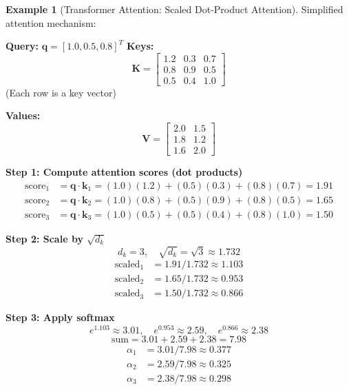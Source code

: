 \documentclass[12pt,a4paper]{article}
\theoremstyle{definition}
\newtheorem{example}{Example}[section]
\begin{document}
\begin{example}[Transformer Attention: Scaled Dot-Product Attention]
Simplified attention mechanism:

\textbf{Query:} $\mathbf{q} = [1.0, 0.5, 0.8]^T$
\textbf{Keys:} 
\begin{equation}
\mathbf{K} = \begin{bmatrix}
1.2 & 0.3 & 0.7 \\
0.8 & 0.9 & 0.5 \\
0.5 & 0.4 & 1.0
\end{bmatrix}
\end{equation}
(Each row is a key vector)

\textbf{Values:}
\begin{equation}
\mathbf{V} = \begin{bmatrix}
2.0 & 1.5 \\
1.8 & 1.2 \\
1.6 & 2.0
\end{bmatrix}
\end{equation}

\textbf{Step 1: Compute attention scores (dot products)}
\begin{align}
\text{score}_1 &= \mathbf{q} \cdot \mathbf{k}_1 = (1.0)(1.2) + (0.5)(0.3) + (0.8)(0.7) = 1.91 \\
\text{score}_2 &= \mathbf{q} \cdot \mathbf{k}_2 = (1.0)(0.8) + (0.5)(0.9) + (0.8)(0.5) = 1.65 \\
\text{score}_3 &= \mathbf{q} \cdot \mathbf{k}_3 = (1.0)(0.5) + (0.5)(0.4) + (0.8)(1.0) = 1.50
\end{align}

\textbf{Step 2: Scale by $\sqrt{d_k}$}
\begin{equation}
d_k = 3, \quad \sqrt{d_k} = \sqrt{3} \approx 1.732
\end{equation}
\begin{align}
\text{scaled}_1 &= 1.91 / 1.732 \approx 1.103 \\
\text{scaled}_2 &= 1.65 / 1.732 \approx 0.953 \\
\text{scaled}_3 &= 1.50 / 1.732 \approx 0.866
\end{align}

\textbf{Step 3: Apply softmax}
\begin{equation}
e^{1.103} \approx 3.01, \quad e^{0.953} \approx 2.59, \quad e^{0.866} \approx 2.38
\end{equation}
\begin{equation}
\text{sum} = 3.01 + 2.59 + 2.38 = 7.98
\end{equation}
\begin{align}
\alpha_1 &= 3.01 / 7.98 \approx 0.377 \\
\alpha_2 &= 2.59 / 7.98 \approx 0.325 \\
\alpha_3 &= 2.38 / 7.98 \approx 0.298
\end{align}


\end{example}
\end{document}
